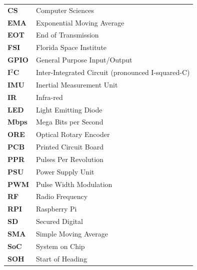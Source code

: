 \begin{table}[H]
\raggedright
{}
\begin{tabular}{>{\bfseries}L{2cm}L{13.65cm}}
CS  	& Computer Sciences		  							\\
EMA     & Exponential Moving Average                        \\
EOT     & End of Transmission                               \\
FSI  	& Florida Space Institute		  					\\
GPIO    & General Purpose Input/Output                      \\
I$^2$C  & Inter-Integrated Circuit (pronounced I-squared-C) \\
IMU     & Inertial Measurement Unit                         \\
IR      & Infra-red                                         \\
LED     & Light Emitting Diode                              \\
Mbps    & Mega Bits per Second                              \\
ORE     & Optical Rotary Encoder                            \\
PCB     & Printed Circuit Board                             \\
PPR     & Pulses Per Revolution                             \\
PSU     & Power Supply Unit                                 \\
PWM     & Pulse Width Modulation                            \\
RF      & Radio Frequency                                   \\
RPI     & Raspberry Pi                                      \\
SD      & Secured Digital                                   \\
SMA     & Simple Moving Average                             \\
SoC     & System on Chip                                    \\
SOH     & Start of Heading                                  \\
\end{tabular}
\end{table}


